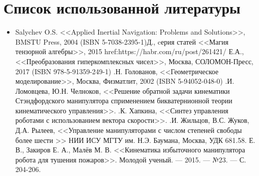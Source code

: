 \section{Список использованной литературы}

\begin{itemize}
\item Salychev O.S. <<Applied Inertial Navigation: Problems and Solutions>>, BMSTU Press, 2004 (ISBN 5-7038-2395-1) Д., cерия статей <<Магия тензорной алгебры>>, 2015 \newline href:https://habr.com/ru/post/261421/
 Е.А., <<Преобразования гиперкомплексных чисел>>, Москва, СОЛОМОН-Пресс, 2017 (ISBN 978-5-91359-249-1)
.Н. Голованов, <<Геометрическое моделирование>>, Москва, Физматлит, 2002 (ISBN 5-94052-048-0)
.И. Ломовцева, Ю.Н. Челноков, <<Решение обратной задачи кинематики Стэндфордского манипулятора сприменением бикватернионной теории кинематического управления>>.
.К. Хапкина, <<Синтез управления роботами с использованием вектора скорости>>.
.И. Жильцов, В.С. Жуков, Д.А. Рылеев, <<Управление манипуляторами  с числом степеней свободы более шести >> НИИ ИСУ МГТУ им. Н.Э. Баумана, Москва, УДК 681.58.
 Е. В., Закиров Е. А., Малёв М. В. <<Кинематика избыточного манипулятора робота для тушения пожаров>>. Молодой ученый. — 2015. — №23. — С. 204-206.
\end{itemize}

